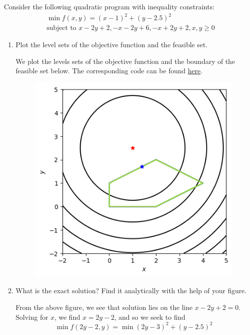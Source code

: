 \documentclass{../kin_math}
\begin{document}
\begin{questions}
  \question Consider the following quadratic program with inequality constraints:
  \begin{align*}
    &\min f(x, y) = (x - 1)^2 + (y - 2.5)^2 \\
    &\text{subject to } x - 2y + 2, -x - 2y + 6, -x + 2y + 2, x, y \geq 0
  \end{align*}
  \begin{enumerate}
    \item Plot the level sets of the objective function and the feasible set.
    \begin{solution}
      We plot the levels sets of the objective function and the boundary of the feasible set below. The corresponding code can be found \href{https://github.com/elijahkin/amsc660/blob/main/hw13/hw13.ipynb}{here}.
      \begin{figure}
        \centering
        \includegraphics[scale=0.8]{feasible.png}
      \end{figure}
    \end{solution}
    \item What is the exact solution? Find it analytically with the help of your figure.
    \begin{solution}
      From the above figure, we see that solution lies on the line $x - 2y + 2 = 0$. Solving for $x$, we find $x = 2y - 2$, and so we seek to find
      \begin{equation*}
        \min f(2y - 2, y) = \min (2y - 3)^2 + (y - 2.5)^2
      \end{equation*}

\end{solution}
\end{enumerate}
\end{questions}
\end{document}
